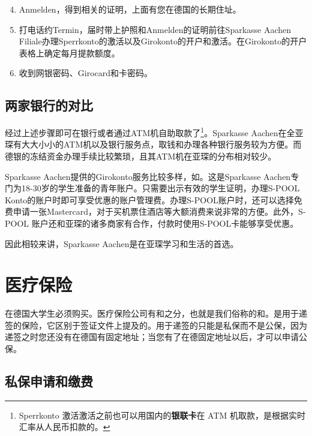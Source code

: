     \begin{enumerate}
      \setcounter{enumi}{3}
      \item Anmelden，得到相关的证明，上面有您在德国的长期住址。
      \item 打电话约Termin，届时带上护照和Anmelden的证明前往Sparkasse Aachen Filiale办理Sperrkonto的激活以及Girokonto的开户和激活。在Girokonto的开户表格上确定每月提款额度。
      \item 收到网银密码、Girocard和卡密码。
    \end{enumerate}

  \subsection{两家银行的对比}

    经过上述步骤即可在银行或者通过ATM机自助取款了\footnote{Sperrkonto 激活激活之前也可以用国内的\textbf{银联卡}在 ATM 机取款，是根据实时汇率从人民币扣款的。}。Sparkasse Aachen在全亚琛有大大小小的ATM机以及银行服务点，取钱和办理各种银行服务较为方便。而德银的冻结资金办理手续比较繁琐，且其ATM机在亚琛的分布相对较少。

    Sparkasse Aachen提供的Girokonto服务比较多样，如\href{https://www.sparkasse-aachen.de/de/home/privatkunden/girokonto/s-pool.html}{}。这是Sparkasse Aachen专门为18-30岁的学生准备的青年账户。只需要出示有效的学生证明，办理S-POOL Konto的账户时即可享受优惠的账户管理费。办理S-POOL账户时，还可以选择免费申请一张Mastercard，对于买机票住酒店等大额消费来说非常的方便。此外，S-POOL 账户还和亚琛的诸多商家有合作，付款时使用S-POOL卡能够享受优惠。

    因此相较来讲，Sparkasse Aachen是在亚琛学习和生活的首选。

\section{医疗保险}\label{sec:医疗保险}

  在德国大学生必须购买。医疗保险公司有和之分，也就是我们俗称的和。是用于递签的保险，它区别于签证文件上提及的。用于递签的只能是私保而不是公保，因为递签之时您还没有在德国有固定地址；当您有了在德固定地址以后，才可以申请公保。

  \subsection{私保申请和缴费}\label{subsec:私保申请和缴费}

